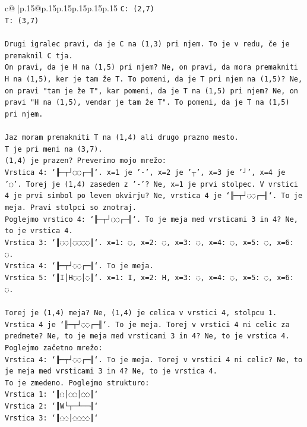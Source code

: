 \documentclass{article}
\begin{document}
{\begin{supertabular}{c@{$\;$}|p{.15\linewidth}@{}p{.15\linewidth}p{.15\linewidth}p{.15\linewidth}p{.15\linewidth}p{.15\linewidth}}
{{{\texttt{C: (2,7)} \\
\texttt{T: (3,7)} \\
\\ 
\texttt{Drugi igralec pravi, da je C na (1,3) pri njem. To je v redu, če je premaknil C tja.} \\
\texttt{On pravi, da je H na (1,5) pri njem? Ne, on pravi, da mora premakniti H na (1,5), ker je tam že T. To pomeni, da je T pri njem na (1,5)? Ne, on pravi "tam je že T", kar pomeni, da je T na (1,5) pri njem? Ne, on pravi "H na (1,5), vendar je tam že T". To pomeni, da je T na (1,5) pri njem.} \\
\\ 
\texttt{Jaz moram premakniti T na (1,4) ali drugo prazno mesto.} \\
\texttt{T je pri meni na (3,7).} \\
\texttt{(1,4) je prazen? Preverimo mojo mrežo:} \\
\texttt{Vrstica 4: `╟─┬┘◌◌┌─╢`. x=1 je '{-}', x=2 je '┬', x=3 je '┘', x=4 je '◌'. Torej je (1,4) zaseden z '{-}'? Ne, x=1 je prvi stolpec. V vrstici 4 je prvi simbol po levem okvirju? Ne, vrstica 4 je `╟─┬┘◌◌┌─╢`. To je meja. Pravi stolpci so znotraj.} \\
\texttt{Poglejmo vrstico 4: `╟─┬┘◌◌┌─╢`. To je meja med vrsticami 3 in 4? Ne, to je vrstica 4.} \\
\texttt{Vrstica 3: `║◌◌│◌◌◌◌║`. x=1: ◌, x=2: ◌, x=3: ◌, x=4: ◌, x=5: ◌, x=6: ◌.} \\
\texttt{Vrstica 4: `╟─┬┘◌◌┌─╢`. To je meja.} \\
\texttt{Vrstica 5: `║I│H◌◌│◌║`. x=1: I, x=2: H, x=3: ◌, x=4: ◌, x=5: ◌, x=6: ◌.} \\
\\ 
\texttt{Torej je (1,4) meja? Ne, (1,4) je celica v vrstici 4, stolpcu 1.} \\
\texttt{Vrstica 4 je `╟─┬┘◌◌┌─╢`. To je meja. Torej v vrstici 4 ni celic za predmete? Ne, to je meja med vrsticami 3 in 4? Ne, to je vrstica 4.} \\
\texttt{Poglejmo začetno mrežo:} \\
\texttt{Vrstica 4: `╟─┬┘◌◌┌─╢`. To je meja. Torej v vrstici 4 ni celic? Ne, to je meja med vrsticami 3 in 4? Ne, to je vrstica 4.} \\
\texttt{To je zmedeno. Poglejmo strukturo:} \\
\texttt{Vrstica 1: `║◌│◌◌│◌◌║`} \\
\texttt{Vrstica 2: `║W└┬─┴──╢`} \\
\texttt{Vrstica 3: `║◌◌│◌◌◌◌║`} \\
}}}
\end{supertabular}}
\end{document}
